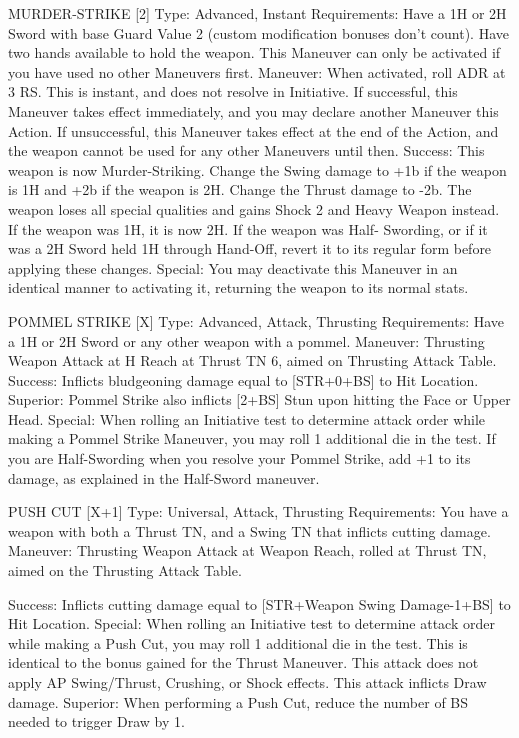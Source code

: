 \documentclass[oneside,11pt,english]{book}
\begin{document}
 

MURDER-STRIKE [2] 
Type: Advanced, Instant 
Requirements: Have a 1H or 2H Sword with base Guard Value 2 (custom modification bonuses don’t 
count). Have two hands available to hold the weapon. This Maneuver can only be activated if you have 
used no other Maneuvers first. 
Maneuver: When activated, roll ADR at 3 RS. This is instant, and does not resolve in Initiative. If 
successful, this Maneuver takes effect immediately, and you may declare another Maneuver this Action. 
If unsuccessful, this Maneuver takes effect at the end of the Action, and the weapon cannot be used for 
any other Maneuvers until then. 
Success: This weapon is now Murder-Striking. Change the Swing damage to +1b if the weapon is 1H and 
+2b if the weapon is 2H. Change the Thrust damage to -2b. The weapon loses all special qualities and 
gains Shock 2 and Heavy Weapon instead. If the weapon was 1H, it is now 2H. If the weapon was Half-
Swording, or if it was a 2H Sword held 1H through Hand-Off, revert it to its regular form before applying 
these changes. 
Special: You may deactivate this Maneuver in an identical manner to activating it, returning the weapon 
to its normal stats. 

 

POMMEL STRIKE [X] 
Type: Advanced, Attack, Thrusting 
Requirements: Have a 1H or 2H Sword or any other weapon with a pommel. 
Maneuver: Thrusting Weapon Attack at H Reach at Thrust TN 6, aimed on Thrusting Attack Table. 
Success: Inflicts bludgeoning damage equal to [STR+0+BS] to Hit Location. 
Superior: Pommel Strike also inflicts [2+BS] Stun upon hitting the Face or Upper Head. 
Special: When rolling an Initiative test to determine attack order while making a Pommel Strike 
Maneuver, you may roll 1 additional die in the test. If you are Half-Swording when you resolve your 
Pommel Strike, add +1 to its damage, as explained in the Half-Sword maneuver. 

 

PUSH CUT [X+1] 
Type: Universal, Attack, Thrusting 
Requirements: You have a weapon with both a Thrust TN, and a Swing TN that inflicts cutting damage. 
Maneuver: Thrusting Weapon Attack at Weapon Reach, rolled at Thrust TN, aimed on the Thrusting 
Attack Table. 


Success: Inflicts cutting damage equal to [STR+Weapon Swing Damage-1+BS] to Hit Location. 
Special: When rolling an Initiative test to determine attack order while making a Push Cut, you may roll 1 
additional die in the test. This is identical to the bonus gained for the Thrust Maneuver. 
This attack does not apply AP Swing/Thrust, Crushing, or Shock effects. 
This attack inflicts Draw damage. 
Superior: When performing a Push Cut, reduce the number of BS needed to trigger Draw by 1. 
\end{document}
